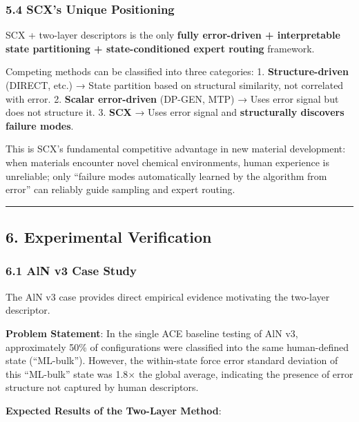 \documentclass[
  12pt,
]{article}
\begin{document}
\subsubsection{5.4 SCX's Unique Positioning}\label{scxs-unique-positioning}

SCX + two-layer descriptors is the only \textbf{fully error-driven + interpretable state partitioning + state-conditioned expert routing} framework.

Competing methods can be classified into three categories: 1. \textbf{Structure-driven} (DIRECT, etc.) → State partition based on structural similarity, not correlated with error. 2. \textbf{Scalar error-driven} (DP-GEN, MTP) → Uses error signal but does not structure it. 3. \textbf{SCX} → Uses error signal and \textbf{structurally discovers failure modes}.

This is SCX's fundamental competitive advantage in new material development: when materials encounter novel chemical environments, human experience is unreliable; only ``failure modes automatically learned by the algorithm from error'' can reliably guide sampling and expert routing.

\begin{center}\rule{0.5\linewidth}{0.5pt}\end{center}

\subsection{6. Experimental Verification}\label{experimental-verification}

\subsubsection{6.1 AlN v3 Case Study}\label{aln-v3-case-study-exp}

The AlN v3 case provides direct empirical evidence motivating the two-layer descriptor.

\textbf{Problem Statement}: In the single ACE baseline testing of AlN v3, approximately 50\% of configurations were classified into the same human-defined state (``ML-bulk''). However, the within-state force error standard deviation of this ``ML-bulk'' state was 1.8$\times$ the global average, indicating the presence of error structure not captured by human descriptors.

\textbf{Expected Results of the Two-Layer Method}:
\end{document}
